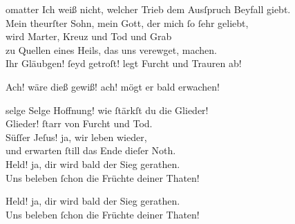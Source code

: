 \documentclass[shorttitlesize=50,tocstyle=ref-genre]{ees}
\begin{document}
{\begin{movement}{omatter}
    \voice[Maria]
    Ich weiß nicht, welcher Trieb dem Ausſpruch Beyfall giebt.\\
    Mein theurſter Sohn, mein Gott, der mich ſo ſehr geliebt,\\
    wird Marter, Kreuz und Tod und Grab\\
    zu Quellen eines Heils, das uns verewget, machen.\\
    Ihr Gläubgen! ſeyd getroſt! legt Furcht und Trauren ab!

    Ach! wäre dieß gewiß! ach! mögt er bald erwachen!\\\strut
  \end{movement}

  \begin{movement}{selge}
    \voice[Maria]
    Selge Hoffnung! wie ſtärkſt du die Glieder!\\
    Glieder! ſtarr von Furcht und Tod.\\
    Süſſer Jeſus! ja, wir leben wieder,\\
    und erwarten ſtill das Ende dieſer Noth.\\
    Held! ja, dir wird bald der Sieg gerathen.\\
    Uns beleben ſchon die Früchte deiner Thaten!

    Held! ja, dir wird bald der Sieg gerathen.\\
    Uns beleben ſchon die Früchte deiner Thaten!
  \end{movement}

}
\end{document}
